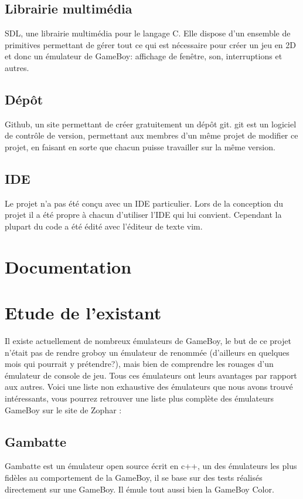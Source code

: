 \documentclass{report}
\begin{document}
\subsection{Librairie multimédia}
SDL, une librairie multimédia pour le langage C. Elle dispose d'un ensemble de primitives permettant de gérer tout ce qui est nécessaire pour créer un jeu en 2D et donc un émulateur de GameBoy: affichage de fenêtre, son, interruptions et autres.

\subsection{Dépôt}
Github, un site permettant de créer gratuitement un dépôt git. git est un logiciel de contrôle de version, permettant aux membres d'un même projet de modifier ce projet, en faisant en sorte que chacun puisse travailler sur la même version.

\subsection{IDE}
Le projet n'a pas été conçu avec un IDE particulier. Lors de la conception du projet il a été propre à chacun d'utiliser l'IDE qui lui convient. Cependant la plupart du code a été édité avec l'éditeur de texte vim.
\section{Documentation}
\section{Etude de l'existant}
Il existe actuellement de nombreux émulateurs de GameBoy, le but de ce projet n'était pas de rendre groboy un émulateur de renommée (d'ailleurs en quelques mois qui pourrait y prétendre?), mais bien de comprendre les rouages d'un émulateur de console de jeu.
Tous ces émulateurs ont leurs avantages par rapport aux autres. Voici une liste non exhaustive des émulateurs que nous avons trouvé intéressants, vous pourrez retrouver une liste plus complète des émulateurs GameBoy sur le site de Zophar \cite{zophar}:

\subsection{Gambatte}
Gambatte \cite{gambatte} est un émulateur open source écrit en c++, un des émulateurs les plus fidèles au comportement de la GameBoy, il se base sur des tests réalisés directement sur une GameBoy. Il émule tout aussi bien la GameBoy Color.
\end{document}
